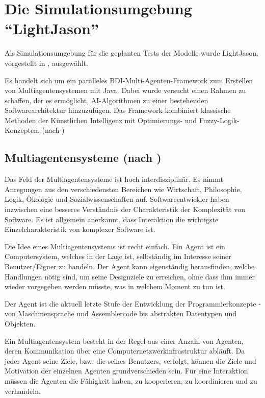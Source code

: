 \section{Die Simulationsumgebung \enquote{LightJason}}

Als Simulationsumgebung für die geplanten Tests der Modelle wurde LightJason, vorgestellt in \cite{lightjason}, ausgewählt.

Es handelt sich um ein paralleles BDI-Multi-Agenten-Framework zum Erstellen von Multiagentensystemen mit Java. 
Dabei wurde versucht einen Rahmen zu schaffen, der es ermöglicht, AI-Algorithmen zu einer bestehenden Softwarearchitektur hinzuzufügen. 
Das Framework kombiniert klassische Methoden der Künstlichen Intelligenz mit Optimierungs- und Fuzzy-Logik-Konzepten.
(nach \cite{lightjason-web})

\subsection{Multiagentensysteme (nach \cite{multiagent})}

Das Feld der Multiagentensysteme ist hoch interdisziplinär.
Es nimmt Anregungen aus den verschiedensten Bereichen wie Wirtschaft, Philosophie, Logik, Ökologie und Sozialwissenschaften auf. 
Softwareentwickler haben inzwischen eine besseres Verständnis der Charakteristik der Komplexität von Software.
Es ist allgemein anerkannt, dass Interaktion die wichtigste Einzelcharakteristik von komplexer Software ist.

Die Idee eines Multiagentensystems ist recht einfach.
Ein Agent ist ein Computersystem, welches in der Lage ist, selbständig im Interesse seiner Benutzer/Eigner zu handeln.
Der Agent kann eigenständig herausfinden, welche Handlungen nötig sind, um seine Designziele zu erreichen, ohne dass ihm immer wieder vorgegeben werden müsste, was in welchem Moment zu tun ist.

Der Agent ist die aktuell letzte Stufe der Entwicklung der Programmierkonzepte - von Maschinensprache und Assemblercode bis abstrakten Datentypen und Objekten.

Ein Multiagentensystem besteht in der Regel aus einer Anzahl von Agenten, deren Kommunikation über eine Computernetzwerkinfrastruktur abläuft.
Da jeder Agent seine Ziele, bzw. die seines Benutzers, verfolgt, können die Ziele und Motivation der einzelnen Agenten grundverschieden sein.
Für eine Interaktion müssen die Agenten die Fähigkeit haben, zu kooperieren, zu koordinieren und zu verhandeln.

